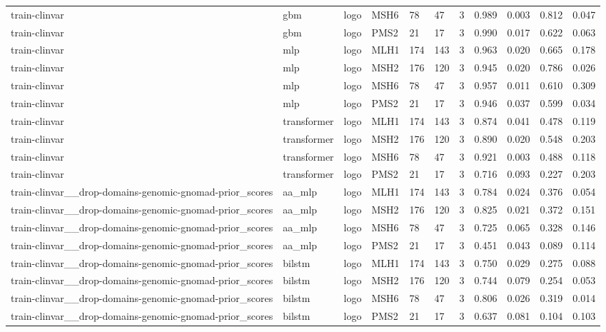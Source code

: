 \begin{table}[t]
\begin{tabular}{lllllllllll}
train-clinvar & gbm & logo & MSH6 & 78 & 47 & 3 & 0.989 & 0.003 & 0.812 & 0.047 \\
train-clinvar & gbm & logo & PMS2 & 21 & 17 & 3 & 0.990 & 0.017 & 0.622 & 0.063 \\
train-clinvar & mlp & logo & MLH1 & 174 & 143 & 3 & 0.963 & 0.020 & 0.665 & 0.178 \\
train-clinvar & mlp & logo & MSH2 & 176 & 120 & 3 & 0.945 & 0.020 & 0.786 & 0.026 \\
train-clinvar & mlp & logo & MSH6 & 78 & 47 & 3 & 0.957 & 0.011 & 0.610 & 0.309 \\
train-clinvar & mlp & logo & PMS2 & 21 & 17 & 3 & 0.946 & 0.037 & 0.599 & 0.034 \\
train-clinvar & transformer & logo & MLH1 & 174 & 143 & 3 & 0.874 & 0.041 & 0.478 & 0.119 \\
train-clinvar & transformer & logo & MSH2 & 176 & 120 & 3 & 0.890 & 0.020 & 0.548 & 0.203 \\
train-clinvar & transformer & logo & MSH6 & 78 & 47 & 3 & 0.921 & 0.003 & 0.488 & 0.118 \\
train-clinvar & transformer & logo & PMS2 & 21 & 17 & 3 & 0.716 & 0.093 & 0.227 & 0.203 \\
train-clinvar\_\_drop-domains-genomic-gnomad-prior\_scores & aa\_mlp & logo & MLH1 & 174 & 143 & 3 & 0.784 & 0.024 & 0.376 & 0.054 \\
train-clinvar\_\_drop-domains-genomic-gnomad-prior\_scores & aa\_mlp & logo & MSH2 & 176 & 120 & 3 & 0.825 & 0.021 & 0.372 & 0.151 \\
train-clinvar\_\_drop-domains-genomic-gnomad-prior\_scores & aa\_mlp & logo & MSH6 & 78 & 47 & 3 & 0.725 & 0.065 & 0.328 & 0.146 \\
train-clinvar\_\_drop-domains-genomic-gnomad-prior\_scores & aa\_mlp & logo & PMS2 & 21 & 17 & 3 & 0.451 & 0.043 & 0.089 & 0.114 \\
train-clinvar\_\_drop-domains-genomic-gnomad-prior\_scores & bilstm & logo & MLH1 & 174 & 143 & 3 & 0.750 & 0.029 & 0.275 & 0.088 \\
train-clinvar\_\_drop-domains-genomic-gnomad-prior\_scores & bilstm & logo & MSH2 & 176 & 120 & 3 & 0.744 & 0.079 & 0.254 & 0.053 \\
train-clinvar\_\_drop-domains-genomic-gnomad-prior\_scores & bilstm & logo & MSH6 & 78 & 47 & 3 & 0.806 & 0.026 & 0.319 & 0.014 \\
train-clinvar\_\_drop-domains-genomic-gnomad-prior\_scores & bilstm & logo & PMS2 & 21 & 17 & 3 & 0.637 & 0.081 & 0.104 & 0.103 \\

\end{tabular}
\end{table}
